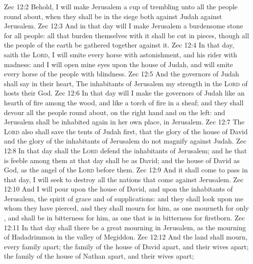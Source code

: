 \vs Zec 12:2 Behold, I will make Jerusalem a cup of trembling unto all the people round about, when they shall be in the siege both against Judah  against Jerusalem.
\vs Zec 12:3 And in that day will I make Jerusalem a burdensome stone for all people: all that burden themselves with it shall be cut in pieces, though all the people of the earth be gathered together against it.
\vs Zec 12:4 In that day, saith the \textsc{Lord}, I will smite every horse with astonishment, and his rider with madness: and I will open mine eyes upon the house of Judah, and will smite every horse of the people with blindness.
\vs Zec 12:5 And the governors of Judah shall say in their heart, The inhabitants of Jerusalem  my strength in the \textsc{Lord} of hosts their God.
\vs Zec 12:6 In that day will I make the governors of Judah like an hearth of fire among the wood, and like a torch of fire in a sheaf; and they shall devour all the people round about, on the right hand and on the left: and Jerusalem shall be inhabited again in her own place,  in Jerusalem.
\vs Zec 12:7 The \textsc{Lord} also shall save the tents of Judah first, that the glory of the house of David and the glory of the inhabitants of Jerusalem do not magnify  against Judah.
\vs Zec 12:8 In that day shall the \textsc{Lord} defend the inhabitants of Jerusalem; and he that is feeble among them at that day shall be as David; and the house of David  as God, as the angel of the \textsc{Lord} before them.
\vs Zec 12:9 And it shall come to pass in that day,  I will seek to destroy all the nations that come against Jerusalem.
\vs Zec 12:10 And I will pour upon the house of David, and upon the inhabitants of Jerusalem, the spirit of grace and of supplications: and they shall look upon me whom they have pierced, and they shall mourn for him, as one mourneth for  only , and shall be in bitterness for him, as one that is in bitterness for  firstborn.
\vs Zec 12:11 In that day shall there be a great mourning in Jerusalem, as the mourning of Hadadrimmon in the valley of Megiddon.
\vs Zec 12:12 And the land shall mourn, every family apart; the family of the house of David apart, and their wives apart; the family of the house of Nathan apart, and their wives apart;
